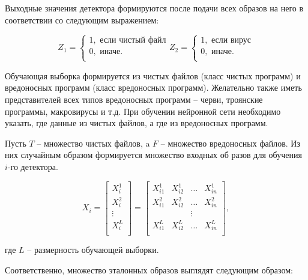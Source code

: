 \documentclass[bachelor, och, referat]{template}
\begin{document}
Выходные значения детектора формируются после подачи всех
образов на него в соответствии со следующим выражением:

\begin{equation}
    Z_1 =
    \begin{cases}
        1, \text{ если чистый файл} \\
        0, \text{ иначе.} \\
    \end{cases}
    Z_2 =
    \begin{cases}
        1, \text{ если вирус} \\
        0, \text{ иначе.} \\
    \end{cases}
    \label{eq1}
\end{equation}

Обучающая выборка формируется из чистых файлов (класс чистых
программ) и вредоносных программ (класс вредоносных программ). Желательно 
также иметь представителей всех типов вредоносных программ -- черви, 
троянские программы, макровирусы и т.д. При обуче­нии нейронной сети
необходимо указать, где данные из чистых файлов, а где из
вредоносных программ.

Пусть $T$ -- множество чистых файлов, a $F$ -- множество вредоносных
файлов. Из них случайным образом формируется множество входных об­
разов для обучения $i$-го детектора.

\begin{equation}
    X_i =
    \begin{bmatrix}
        X_i^1 \\
        X_i^2 \\
        \vdots \\
        X_i^L \\
    \end{bmatrix}
    =
    \begin{bmatrix}
        X_{i1}^1 & X_{i2}^1 & \dots & X_{in}^1 \\
        X_{i1}^2 & X_{i2}^2 & \dots & X_{in}^2 \\
        && \vdots & \\
        X_{i1}^L & X_{i2}^L & \dots & X_{in}^L \\    
    \end{bmatrix},
    \label{eq2}
\end{equation}

где $L$ -- размерность обучающей выборки.

Соответственно, множество эталонных образов выглядят следующим
образом:
\end{document}
